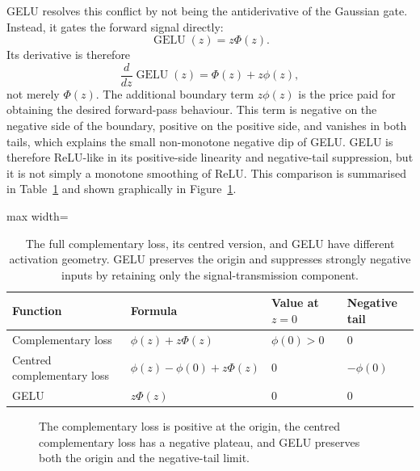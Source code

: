 \documentclass[11pt]{article}
\begin{document}
GELU resolves this conflict by not being the antiderivative of the Gaussian gate. Instead, it gates the forward signal directly:
$$
\operatorname{GELU}(z)=z\Phi(z).
$$
Its derivative is therefore
$$
\frac{d}{dz}\operatorname{GELU}(z)
=
\Phi(z)+z\phi(z),
$$
not merely $ \Phi(z) $. The additional boundary term $ z\phi(z) $ is the price paid for obtaining the desired forward-pass behaviour. This term is negative on the negative side of the boundary, positive on the positive side, and vanishes in both tails, which explains the small non-monotone negative dip of GELU.
GELU is therefore ReLU-like in its positive-side linearity and negative-tail suppression, but it is not simply a monotone smoothing of ReLU. This comparison is summarised in Table~\ref{tab:comparison} and shown graphically in Figure~\ref{fig:comparison}.

\begin{table}[tbp]
\centering
\small
\begin{adjustbox}{max width=\columnwidth}
\begin{tabular}{@{}llll@{}}
\toprule
Function & Formula & Value at $ z=0 $ & Negative tail \\
\midrule
Complementary loss
&
$ \phi(z)+z\Phi(z) $
&
$ \phi(0)>0 $
&
$ 0 $
\\
Centred complementary loss
&
$ \phi(z)-\phi(0)+z\Phi(z) $
&
$ 0 $
&
$ -\phi(0) $
\\
GELU
&
$ z\Phi(z) $
&
$ 0 $
&
$ 0 $
\\
\bottomrule
\end{tabular}
\end{adjustbox}
\caption{The full complementary loss, its centred version, and GELU have different activation geometry. GELU preserves the origin and suppresses strongly negative inputs by retaining only the signal-transmission component.}
\label{tab:comparison}
\end{table}

\begin{figure}
\centering
{}
\caption{The complementary loss is positive at the origin, the centred complementary loss has a negative plateau, and GELU preserves both the origin and the negative-tail limit.}
\label{fig:comparison}
\end{figure}
\end{document}
